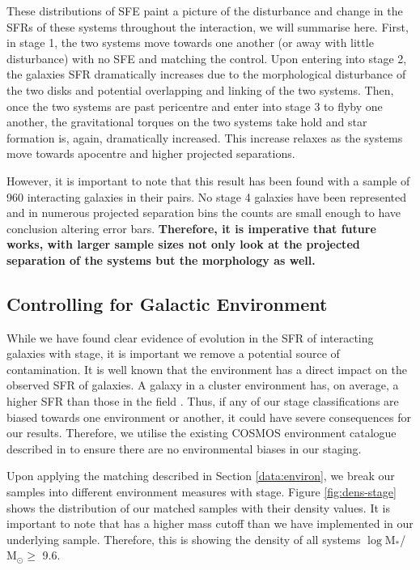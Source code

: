 \documentclass[fleqn,usenatbib]{mnras}
\begin{document}
These distributions of SFE paint a picture of the disturbance and change in the SFRs of these systems throughout the interaction, we will summarise here. First, in stage 1, the two systems move towards one another (or away with little disturbance) with no SFE and matching the control. Upon entering into stage 2, the galaxies SFR dramatically increases due to the morphological disturbance of the two disks and potential overlapping and linking of the two systems. Then, once the two systems are past pericentre and enter into stage 3 to flyby one another, the gravitational torques on the two systems take hold and star formation is, again, dramatically increased. This increase relaxes as the systems move towards apocentre and higher projected separations. 

However, it is important to note that this result has been found with a sample of 960 interacting galaxies in their pairs. No stage 4 galaxies have been represented and in numerous projected separation bins the counts are small enough to have conclusion altering error bars. \textbf{Therefore, it is imperative that future works, with larger sample sizes not only look at the projected separation of the systems but the morphology as well.}

\subsection{Controlling for Galactic Environment} \label{sec:env-cont}
\noindent While we have found clear evidence of evolution in the SFR of interacting galaxies with stage, it is important we remove a potential source of contamination. It is well known that the environment has a direct impact on the observed SFR of galaxies. A galaxy in a cluster environment has, on average, a higher SFR than those in the field \citep{2006MNRAS.373..469B}. Thus, if any of our stage classifications are biased towards one environment or another, it could have severe consequences for our results. Therefore, we utilise the existing COSMOS environment catalogue described in \citet{2017ApJ...837...16D} to ensure there are no environmental biases in our staging. 

Upon applying the matching described in Section \ref{data:environ}, we break our samples into different environment measures with stage. Figure \ref{fig:dens-stage} shows the distribution of our matched samples with their density values. It is important to note that \citet{2017ApJ...837...16D} has a higher mass cutoff than we have implemented in our underlying sample. Therefore, this is showing the density of all systems $\log$M$_*$/ M$_\odot \geq$ 9.6. 
\end{document}
